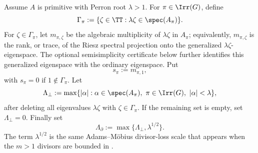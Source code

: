 \begin{definition}
  \label{def:peripheral-peter-weyl-data}
  Assume \(A\) is primitive with Perron root \(\lambda>1\).  For
  \(\pi\in\Irr(G)\), define
  \[
    \Gamma_\pi:=
    \{\zeta\in\TT:\lambda\zeta\in\spec(A_\pi)\}.
  \]
  For \(\zeta\in\Gamma_\pi\), let
  \(m_{\pi,\zeta}\) be the algebraic multiplicity of
  \(\lambda\zeta\) in \(A_\pi\); equivalently,
  \(m_{\pi,\zeta}\) is the rank, or trace, of the Riesz spectral
  projection onto the generalized \(\lambda\zeta\)-eigenspace.  The
  optional semisimplicity certificate below further identifies this
  generalized eigenspace with the ordinary eigenspace.  Put
  \[
    s_\pi:=m_{\pi,1},
  \]
  with \(s_\pi=0\) if \(1\notin\Gamma_\pi\).  Let
  \[
    \Lambda_\perp:=
    \max\{|\alpha|:\alpha\in\spec(A_\pi),\ \pi\in\Irr(G),\
      |\alpha|<\lambda\},
  \]
  after deleting all eigenvalues \(\lambda\zeta\) with
  \(\zeta\in\Gamma_\pi\).  If the remaining set is empty, set
  \(\Lambda_\perp=0\).  Finally set
  \[
    \Lambda_\partial:=\max\{\Lambda_\perp,\lambda^{1/2}\}.
  \]
  The term \(\lambda^{1/2}\) is the same Adams--M\"obius divisor-loss scale
  that appears when the \(m>1\) divisors are bounded in
  .


\end{definition}
